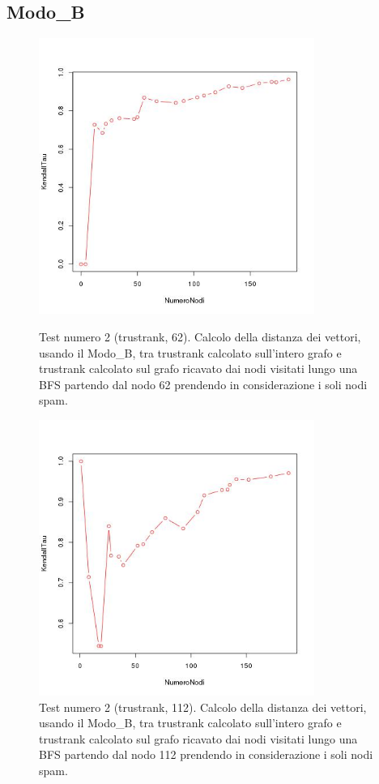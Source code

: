 \subsection{Modo\_B}


\begin{figure}
\centering
 \includegraphics[height=9cm]{immagini/test2/trustrankBadNodesTestMode1_62}
 \caption{Test numero 2 (trustrank, 62). Calcolo della distanza dei vettori, usando il Modo\_B, tra trustrank calcolato sull'intero grafo e trustrank calcolato sul grafo ricavato dai nodi visitati lungo una BFS partendo dal nodo 62 prendendo in considerazione i soli nodi spam. }
 \label{fig:test2trustModoB62}
\centering
 \includegraphics[height=9cm]{immagini/test2/trustrankBadNodesTestMode1_112}
 \caption{Test numero 2 (trustrank, 112). Calcolo della distanza dei vettori, usando il Modo\_B, tra trustrank calcolato sull'intero grafo e trustrank calcolato sul grafo ricavato dai nodi visitati lungo una BFS partendo dal nodo 112 prendendo in considerazione i soli nodi spam.}
 \label{fig:test2trustModoB112}
\end{figure}

